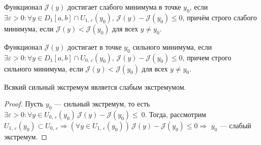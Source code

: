 
\begin{definition}
	Функционал $\mathcal{J}(y)$ достигает слабого минимума в точке $ y_0 $, если $ \exists \varepsilon > 0: \forall y \in D_1[a, b] \cap U_{1, \, \varepsilon}(y_0), \, \mathcal{J}(y) - \mathcal{J}(y_0) \leqslant 0$, причём строго слабого минимума, если $ \mathcal{J}(y) < \mathcal{J}(y_0) $ для всех $ y \not = y_0$.
\end{definition}

\begin{definition}
	Функционал $ \mathcal{J}(y) $ достигает в точке $ y_0 $ сильного минимума, если $ \exists \varepsilon > 0: \forall y \in D_1[a, b] \cap U_{0, \, \varepsilon}(y_0), \, \mathcal{J}(y) - \mathcal{J}(y_0) \leqslant 0 $, причем строго сильного минимума, если $ \mathcal{J}(y) < \mathcal{J}(y_0) $ для всех $ y \not = y_0$.
\end{definition}

\begin{utv}
	Всякий сильный экстремум является слабым экстремумом.
\end{utv}
\begin{proof}
	Пусть $ y_0 $ --- сильный экстремум, то есть $ \exists \varepsilon > 0: \forall y \in U_{0, \, \varepsilon}(y_0) \, \mathcal{J}(y) - \mathcal{J}(y_0) \leqslant~0$.
	Тогда, рассмотрим $ U_{1, \, \varepsilon}(y_0) \subset U_{0, \, \varepsilon} \Rightarrow (
	\forall y \in U_{1, \, \varepsilon}(y_0)) \, \mathcal{J}(y) - \mathcal{J}(y_0) \leqslant 0 \Rightarrow $ $ y_0 $ --- слабый экстремум.  
\end{proof}

